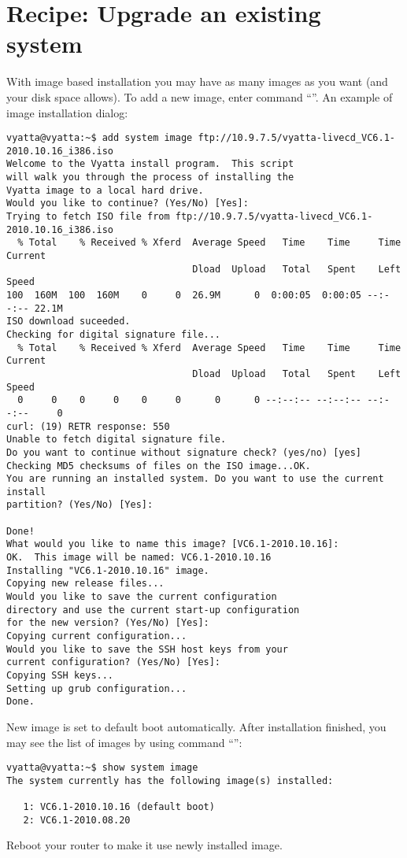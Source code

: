 \section{Recipe: Upgrade an existing system}
\solution
With image based installation you may have as many images as you want (and your disk space allows). To add a new
image, enter command ``''. An example of image installation dialog:
\begin{verbatim}
vyatta@vyatta:~$ add system image ftp://10.9.7.5/vyatta-livecd_VC6.1-2010.10.16_i386.iso
Welcome to the Vyatta install program.  This script
will walk you through the process of installing the
Vyatta image to a local hard drive.
Would you like to continue? (Yes/No) [Yes]: 
Trying to fetch ISO file from ftp://10.9.7.5/vyatta-livecd_VC6.1-2010.10.16_i386.iso
  % Total    % Received % Xferd  Average Speed   Time    Time     Time  Current
                                 Dload  Upload   Total   Spent    Left  Speed
100  160M  100  160M    0     0  26.9M      0  0:00:05  0:00:05 --:--:-- 22.1M
ISO download suceeded.
Checking for digital signature file...
  % Total    % Received % Xferd  Average Speed   Time    Time     Time  Current
                                 Dload  Upload   Total   Spent    Left  Speed
  0     0    0     0    0     0      0      0 --:--:-- --:--:-- --:--:--     0
curl: (19) RETR response: 550
Unable to fetch digital signature file.
Do you want to continue without signature check? (yes/no) [yes] 
Checking MD5 checksums of files on the ISO image...OK.
You are running an installed system. Do you want to use the current install
partition? (Yes/No) [Yes]: 

Done!
What would you like to name this image? [VC6.1-2010.10.16]: 
OK.  This image will be named: VC6.1-2010.10.16
Installing "VC6.1-2010.10.16" image.
Copying new release files...
Would you like to save the current configuration 
directory and use the current start-up configuration 
for the new version? (Yes/No) [Yes]: 
Copying current configuration...
Would you like to save the SSH host keys from your 
current configuration? (Yes/No) [Yes]: 
Copying SSH keys...
Setting up grub configuration...
Done.
\end{verbatim}
New image is set to default boot automatically. After installation finished, you may see the list of images
by using command ``'':
\begin{verbatim}
vyatta@vyatta:~$ show system image 
The system currently has the following image(s) installed:

   1: VC6.1-2010.10.16 (default boot)
   2: VC6.1-2010.08.20
\end{verbatim}
Reboot your router to make it use newly installed image.


